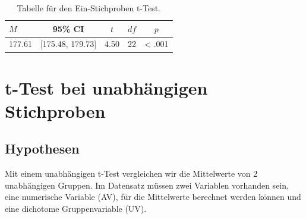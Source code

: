 \documentclass[
]{book}
\newenvironment{Shaded}{\begin{snugshade}}{\end{snugshade}}
\newcommand{\AttributeTok}[1]{\textcolor[rgb]{0.77,0.63,0.00}{#1}}
\newcommand{\DecValTok}[1]{\textcolor[rgb]{0.00,0.00,0.81}{#1}}
\newcommand{\FloatTok}[1]{\textcolor[rgb]{0.00,0.00,0.81}{#1}}
\newcommand{\FunctionTok}[1]{\textcolor[rgb]{0.00,0.00,0.00}{#1}}
\newcommand{\NormalTok}[1]{#1}
\newcommand{\OtherTok}[1]{\textcolor[rgb]{0.56,0.35,0.01}{#1}}
\newcommand{\SpecialCharTok}[1]{\textcolor[rgb]{0.00,0.00,0.00}{#1}}
\newcommand{\StringTok}[1]{\textcolor[rgb]{0.31,0.60,0.02}{#1}}
\begin{document}
\begin{Shaded}
\end{Shaded}

\begin{table}[tbp]

\begin{center}
\begin{threeparttable}

\caption{\label{tab:unnamed-chunk-228}Tabelle für den Ein-Stichproben t-Test.}

\begin{tabular}{lllll}
\toprule
$M$ & \multicolumn{1}{c}{95\% CI} & \multicolumn{1}{c}{$t$} & \multicolumn{1}{c}{$\mathit{df}$} & \multicolumn{1}{c}{$p$}\\
\midrule
177.61 & {}[175.48, 179.73] & 4.50 & 22 & < .001\\
\bottomrule
\end{tabular}

\end{threeparttable}
\end{center}

\end{table}

\hypertarget{t-test-bei-unabhuxe4ngigen-stichproben}{%
\section{t-Test bei unabhängigen Stichproben}\label{t-test-bei-unabhuxe4ngigen-stichproben}}

\hypertarget{hypothesen-2}{%
\subsection{Hypothesen}\label{hypothesen-2}}

Mit einem unabhängigen t-Test vergleichen wir die Mittelwerte von 2 unabhängigen Gruppen. Im Datensatz müssen zwei Variablen vorhanden sein, eine numerische Variable (AV), für die Mittelwerte berechnet werden können und eine dichotome Gruppenvariable (UV).
\end{document}
